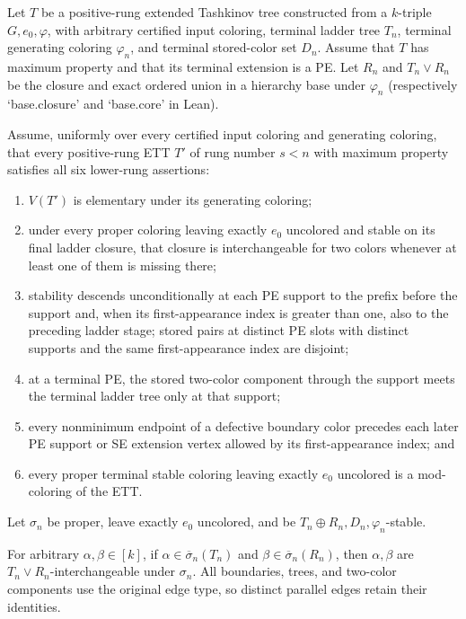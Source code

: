 \begin{lemma}
Let $T$ be a positive-rung extended Tashkinov tree constructed from a
$k$-triple $G,e_0,\varphi$, with arbitrary certified input coloring,
terminal ladder tree $T_n$, terminal generating coloring $\varphi_n$,
and terminal stored-color set $D_n$.  Assume that $T$ has maximum
property and that its terminal extension is a PE.  Let $R_n$ and
$T_n\vee R_n$ be the closure and exact ordered union in a hierarchy
base under $\varphi_n$ (respectively `base.closure' and `base.core'
in Lean).

Assume, uniformly over every certified input coloring and generating
coloring, that every positive-rung ETT $T'$ of rung number $s<n$ with
maximum property satisfies all six lower-rung assertions:
\begin{enumerate}
\item $V(T')$ is elementary under its generating coloring;
\item under every proper coloring leaving exactly $e_0$ uncolored and
stable on its final ladder closure, that closure is interchangeable for
two colors whenever at least one of them is missing there;
\item stability descends unconditionally at each PE support to the prefix before the
support and, when its first-appearance index is greater than one, also to
the preceding ladder stage; stored pairs at
distinct PE slots with distinct supports and the same first-appearance
index are disjoint;
\item at a terminal PE, the stored two-color component through the
support meets the terminal ladder tree only at that support;
\item every nonminimum endpoint of a defective boundary color precedes
each later PE support or SE extension vertex allowed by its
first-appearance index; and
\item every proper terminal stable coloring leaving exactly $e_0$
uncolored is a mod-coloring of the ETT.
\end{enumerate}

Let $\sigma_n$ be proper, leave exactly $e_0$ uncolored, and be
$T_n\oplus R_n,D_n,\varphi_n$-stable.

For arbitrary $\alpha,\beta\in[k]$, if
$\alpha\in\overline\sigma_n(T_n)$ and
$\beta\in\overline\sigma_n(R_n)$, then $\alpha,\beta$ are
$T_n\vee R_n$-interchangeable under $\sigma_n$.
All boundaries, trees, and two-color components use the original edge
type, so distinct parallel edges retain their identities.
\end{lemma}
